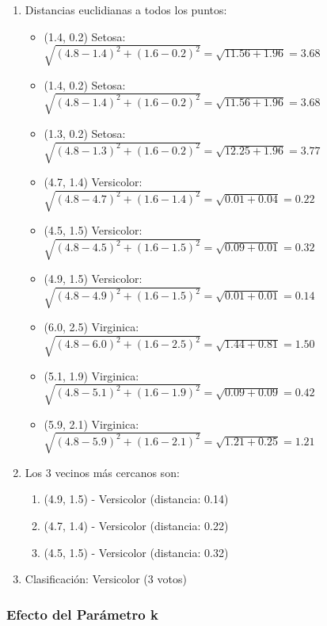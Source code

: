 \documentclass[12pt]{article}
\begin{document}
\begin{enumerate}
    \item Distancias euclidianas a todos los puntos:
    \begin{itemize}
        \item (1.4, 0.2) Setosa: $\sqrt{(4.8-1.4)^2 + (1.6-0.2)^2} = \sqrt{11.56 + 1.96} = 3.68$
        \item (1.4, 0.2) Setosa: $\sqrt{(4.8-1.4)^2 + (1.6-0.2)^2} = \sqrt{11.56 + 1.96} = 3.68$
        \item (1.3, 0.2) Setosa: $\sqrt{(4.8-1.3)^2 + (1.6-0.2)^2} = \sqrt{12.25 + 1.96} = 3.77$
        \item (4.7, 1.4) Versicolor: $\sqrt{(4.8-4.7)^2 + (1.6-1.4)^2} = \sqrt{0.01 + 0.04} = 0.22$
        \item (4.5, 1.5) Versicolor: $\sqrt{(4.8-4.5)^2 + (1.6-1.5)^2} = \sqrt{0.09 + 0.01} = 0.32$
        \item (4.9, 1.5) Versicolor: $\sqrt{(4.8-4.9)^2 + (1.6-1.5)^2} = \sqrt{0.01 + 0.01} = 0.14$
        \item (6.0, 2.5) Virginica: $\sqrt{(4.8-6.0)^2 + (1.6-2.5)^2} = \sqrt{1.44 + 0.81} = 1.50$
        \item (5.1, 1.9) Virginica: $\sqrt{(4.8-5.1)^2 + (1.6-1.9)^2} = \sqrt{0.09 + 0.09} = 0.42$
        \item (5.9, 2.1) Virginica: $\sqrt{(4.8-5.9)^2 + (1.6-2.1)^2} = \sqrt{1.21 + 0.25} = 1.21$
    \end{itemize}
    
    \item Los 3 vecinos más cercanos son:
    \begin{enumerate}
        \item (4.9, 1.5) - Versicolor (distancia: 0.14)
        \item (4.7, 1.4) - Versicolor (distancia: 0.22)
        \item (4.5, 1.5) - Versicolor (distancia: 0.32)
    \end{enumerate}
    
    \item Clasificación: Versicolor (3 votos)
\end{enumerate}

\subsubsection{Efecto del Parámetro k}
\end{document}
